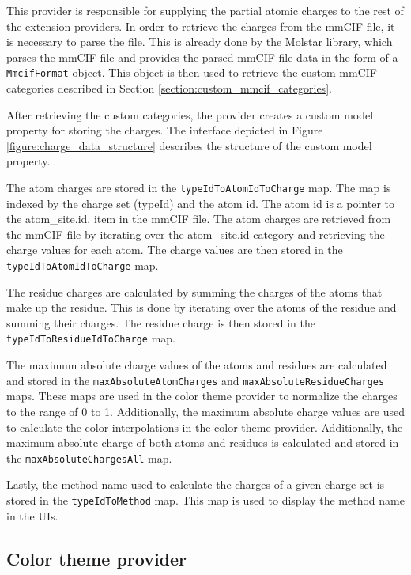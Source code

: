 \documentclass[
  digital,     %
  oneside,     %
  nosansbold,  %
  nocolorbold, %
  lof,         %
  lot,         %
]{fithesis4}
\begin{document}
This provider is responsible for supplying the partial atomic charges to the rest of the extension providers. In order to retrieve the charges from the mmCIF file, it is necessary to parse the file. This is already done by the Molstar library, which parses the mmCIF file and provides the parsed mmCIF file data in the form of a \texttt{MmcifFormat} object. This object is then used to retrieve the custom mmCIF categories described in Section \ref{section:custom_mmcif_categories}.

After retrieving the custom categories, the provider creates a custom model property for storing the charges. The interface depicted in Figure \ref{figure:charge_data_structure} describes the structure of the custom model property.

The atom charges are stored in the \texttt{typeIdToAtomIdToCharge} map. The map is indexed by the charge set (typeId) and the atom id. The atom id is a pointer to the atom\_site.id. item in the mmCIF file. The atom charges are retrieved from the mmCIF file by iterating over the atom\_site.id category and retrieving the charge values for each atom. The charge values are then stored in the \texttt{typeIdToAtomIdToCharge} map.

The residue charges are calculated by summing the charges of the atoms that make up the residue. This is done by iterating over the atoms of the residue and summing their charges. The residue charge is then stored in the \texttt{typeIdToResidueIdToCharge} map.

The maximum absolute charge values of the atoms and residues are calculated and stored in the \texttt{maxAbsoluteAtomCharges} and \texttt{maxAbsoluteResidueCharges} maps. These maps are used in the color theme provider to normalize the charges to the range of 0 to 1. Additionally, the maximum absolute charge values are used to calculate the color interpolations in the color theme provider. Additionally, the maximum absolute charge of both atoms and residues is calculated and stored in the \texttt{maxAbsoluteChargesAll} map.

Lastly, the method name used to calculate the charges of a given charge set is stored in the \texttt{typeIdToMethod} map. This map is used to display the method name in the UIs.

\subsection{Color theme provider}
\label{subsection:color_theme_provider}
\end{document}
